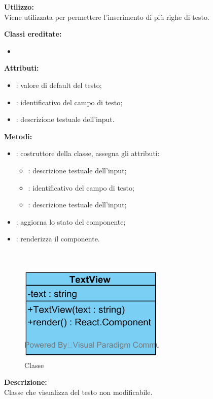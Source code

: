 \textbf{Utilizzo:}\\
Viene utilizzata per permettere l'inserimento di più righe di testo.

\textbf{Classi ereditate:}
\begin{itemize}
	\item {}
\end{itemize}


\textbf{Attributi:}
\begin{itemize}
	\item {}: valore di default del testo;
	\item {}: identificativo del campo di testo;
	\item {}: descrizione testuale dell'input.
\end{itemize}

\textbf{Metodi:}
\begin{itemize}
	\item {}: costruttore della classe, assegna gli attributi:
	\begin{itemize}
		\item {}: descrizione testuale dell'input;
		\item {}: identificativo del campo di testo;
		\item {}: descrizione testuale dell'input;
	\end{itemize}
	\item {}: aggiorna lo stato del componente;
	\item {}: renderizza il componente.
\end{itemize}


\paragraph[::TextView]{\class}\mbox{}\\ \label{\class}
\begin{figure}[H]
	\centering
	\includegraphics[width=7cm]{./diagrammi/framework/view/gui/textview.png}
	\caption{Classe \class}
\end{figure}
\textbf{Descrizione:}\\
Classe che visualizza del testo non modificabile.

